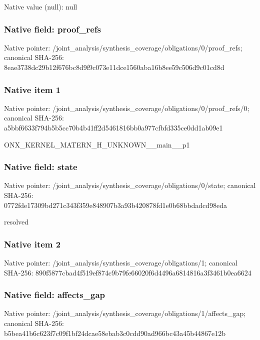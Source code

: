 \documentclass[10pt,a4paper]{article}
\begin{document}
Native value (null): null

\subsubsection{Native field: proof\_\allowbreak{}refs}
Native pointer: /joint\_\allowbreak{}analysis/synthesis\_\allowbreak{}coverage/obligations/0/proof\_\allowbreak{}refs; canonical SHA-256: 8eae3738dc29b12f676bc8d9f9c073e11dce1560aba16b8ee59c506d9c01cd8d

\subsubsection{Native item 1}
Native pointer: /joint\_\allowbreak{}analysis/synthesis\_\allowbreak{}coverage/obligations/0/proof\_\allowbreak{}refs/0; canonical SHA-256: a5bbf6633f794b5b5cc70b4b41ff2d5461816bb0a977cfbfd335ce0dd1ab09e1

\begingroup\raggedright\sloppy ONX\_\allowbreak{}KERNEL\_\allowbreak{}MATERN\_\allowbreak{}H\_\allowbreak{}UNKNOWN\_\allowbreak{}\_\allowbreak{}main\_\allowbreak{}\_\allowbreak{}p1\par\endgroup

\subsubsection{Native field: state}
Native pointer: /joint\_\allowbreak{}analysis/synthesis\_\allowbreak{}coverage/obligations/0/state; canonical SHA-256: 0772fde17309bd271c343f359e848907b3a93b420878fd1e0b68bbdadcd98eda

\begingroup\raggedright\sloppy resolved\par\endgroup

\subsubsection{Native item 2}
Native pointer: /joint\_\allowbreak{}analysis/synthesis\_\allowbreak{}coverage/obligations/1; canonical SHA-256: 890f5877cbad4f519ef874c9b79fe66020f6d4496a6814816a3f3461b0ea6624

\subsubsection{Native field: affects\_\allowbreak{}gap}
Native pointer: /joint\_\allowbreak{}analysis/synthesis\_\allowbreak{}coverage/obligations/1/affects\_\allowbreak{}gap; canonical SHA-256: b5bea41b6c623f7c09f1bf24dcae58ebab3c0cdd90ad966bc43a45b44867e12b
\end{document}
